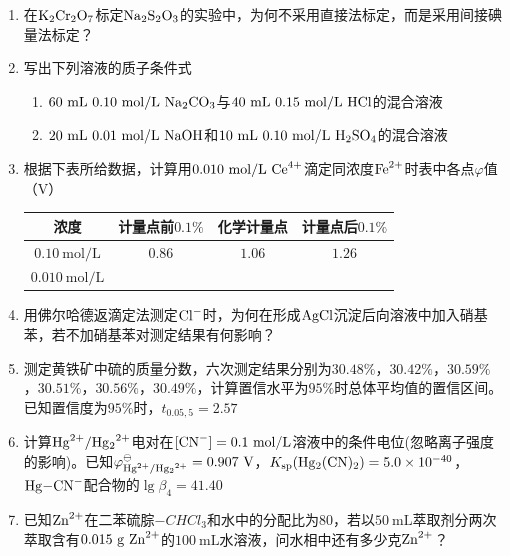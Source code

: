 \begin{enumerate}[label=\arabic*., itemsep=1.5ex]
    \item 在$\ce{K2Cr2O7}$标定$\ce{Na2S2O3}$的实验中，为何不采用直接法标定，而是采用间接碘量法标定？
    \item 写出下列溶液的质子条件式
    \begin{enumerate}[label=(\arabic*), noitemsep, topsep=0pt, partopsep=0pt]
        \item $60\ \mathrm{mL}\ 0.10\ \mathrm{mol/L}\ \ce{Na2CO3}$与$40\ \mathrm{mL}\ 0.15\ \mathrm{mol/L}\ \ce{HCl}$的混合溶液
        \item $20\ \mathrm{mL}\ 0.01\ \mathrm{mol/L}\ \ce{NaOH}$和$10\ \mathrm{mL}\ 0.10\ \mathrm{mol/L}\ \ce{H2SO4}$的混合溶液
    \end{enumerate}
    \item 根据下表所给数据，计算用$0.010\ \mathrm{mol/L}\ \ce{Ce^{4+}}$滴定同浓度$\ce{Fe^{2+}}$时表中各点$\varphi$值（$\mathrm{V}$）
    \begin{center}
    \begin{tabular}{|c|c|c|c|}
    \hline
    浓度 & 计量点前$0.1\%$ & 化学计量点 & 计量点后$0.1\%$ \\
    \hline
    $0.10\ \mathrm{mol/L}$ & $0.86$ & $1.06$ & $1.26$ \\
    \hline
    $0.010\ \mathrm{mol/L}$ &  &  &  \\
    \hline
    \end{tabular}
    \end{center}
    \item 用佛尔哈德返滴定法测定$\ce{Cl^-}$时，为何在形成$\ce{AgCl}$沉淀后向溶液中加入硝基苯，若不加硝基苯对测定结果有何影响？
    \item 测定黄铁矿中硫的质量分数，六次测定结果分别为$30.48\%$，$30.42\%$，$30.59\%$，$30.51\%$，$30.56\%$，$30.49\%$，计算置信水平为$95\%$时总体平均值的置信区间。已知置信度为$95\%$时，$t_{0.05,5}=2.57$
    \item 计算$\ce{Hg^{2+}/Hg2^{2+}}$电对在$[\ce{CN^-}]=0.1\ \mathrm{mol/L}$溶液中的条件电位(忽略离子强度的影响)。已知$\varphi^\ominus_{\ce{Hg^{2+}/Hg2^{2+}}}=0.907\ \mathrm{V}$，$K_{\mathrm{sp}}(\ce{Hg2(CN)2})=5.0\times10^{-40}$，$\ce{Hg-CN^-}$配合物的$\lg\beta_4=41.40$
    \item 已知$\ce{Zn^{2+}}$在二苯硫腙$-CHCl_3$和水中的分配比为$80$，若以$50\ \mathrm{mL}$萃取剂分两次萃取含有$0.015\ \mathrm{g}\ \ce{Zn^{2+}}$的$100\ \mathrm{mL}$水溶液，问水相中还有多少克$\ce{Zn^{2+}}$？
\end{enumerate}

